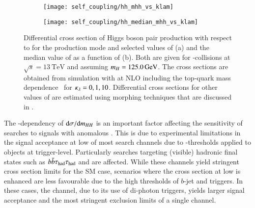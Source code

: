 \begin{figure}[htbp]
  \begin{subfigure}[t]{0.485\textwidth}
    \texttt{[image: self\_coupling/hh\_mhh\_vs\_klam]}
    \subcaption{%
    }%
    \label{fig:hh_xsec_mhh}
  \end{subfigure}\hfill%
  \begin{subfigure}[t]{0.485\textwidth}
    \texttt{[image: self\_coupling/hh\_median\_mhh\_vs\_klam]}
    \subcaption{%
    }%
    \label{fig:hh_median_mhh}
  \end{subfigure}

  \caption{Differential cross section of Higgs boson pair production
    with respect to \mHH for the \ggF production mode and selected
    values of \klambda (a) and the median value of \mHH as a function
    of \klambda (b). Both are given for \pp-collisions at
    $\sqrt{s} = \SI{13}{\TeV}$ and assuming $m_{H} =
    \SI{125.0}{\ensuremath{\text{GeV}}}$. The cross sections are obtained from simulation
    with \POWHEGBOX[v2] at NLO including the top-quark mass
    dependence~\cite{Heinrich:2019bkc,Heinrich:2020ckp} for
    $\kappa_{\lambda} = 0, 1, 10$. Differential cross sections for other
    values of \klambda are estimated using morphing techniques that
    are discussed in .}
\end{figure}

The \klambda-dependency of $\mathrm{d}\sigma / \mathrm{d}m_{HH}$ is an
important factor affecting the sensitivity of searches to signals with
anomalous \klambda. This is due to experimental limitations in the
signal acceptance at low \mHH of most search channels due to
\pT-thresholds applied to objects at trigger-level. Particularly
searches targeting (visible) hadronic final states such as
$b\bar{b}\tau_{\text{had}}\tau_{\text{had}}$ and \bbbb are affected. While these channels yield
stringent cross section limits for the SM case, scenarios where the
cross section at low \mHH is enhanced are less favourable due to the
high thresholds of $b$-jet and \tauhadvis triggers. In these cases,
the \bbyy channel, due to its use of di-photon triggers, yields larger
signal acceptance and the most stringent exclusion limits of a single
channel.


